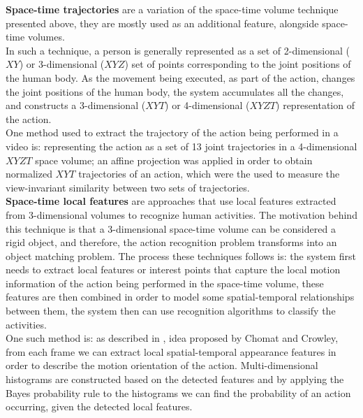 \documentclass[11pt]{report}
\begin{document}
\textbf{Space-time trajectories} are a variation of the space-time volume technique presented above, they are mostly used as an additional feature, alongside space-time volumes.\\
In such a technique, a person is generally represented as a set of 2-dimensional (\(XY\)) or 3-dimensional (\(XYZ\)) set of points corresponding to the joint positions of the human body. As the movement being executed, as part of the action, changes the joint positions of the human body, the system accumulates all the changes, and constructs a 3-dimensional (\(XYT\)) or 4-dimensional (\(XYZT\)) representation of the action. \\
One method used to extract the trajectory of the action being performed in a video is: representing the action as a set of 13 joint trajectories in a 4-dimensional \(XYZT\) space volume; an affine projection was applied in order to obtain normalized \(XYT\) trajectories of an action, which were the used to measure the view-invariant similarity between two sets of trajectories\cite{affine-trajectory}. \\

\textbf{Space-time local features} are approaches that use local features extracted from 3-dimensional volumes to recognize human activities. The motivation behind this technique is that a 3-dimensional space-time volume can be considered a rigid object, and therefore, the action recognition problem transforms into an object matching problem. The process these techniques follows is: the system first needs to extract local features or interest points that capture the local motion information of the action being performed in the space-time volume, these features are then combined in order to model some spatial-temporal relationships between them, the system then can use recognition algorithms to classify the activities. \\
One such method is: as described in \cite{local-features}, idea proposed by Chomat and Crowley, from each frame we can extract local spatial-temporal appearance features in order to describe the motion orientation of the action. Multi-dimensional histograms are constructed based on the detected features and by applying the Bayes probability rule to the histograms we can find the probability of an action occurring, given the detected local features. \\    
\end{document}

